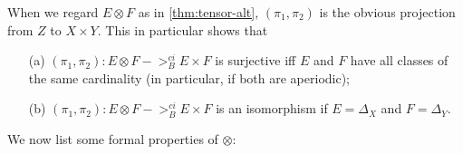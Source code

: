 \documentclass[11pt]{article}
\begin{document}
When we regard $E \otimes F$ as in \cref{thm:tensor-alt}, $(\pi_1, \pi_2)$ is the obvious projection from $Z$ to $X \times Y$.  This in particular shows that
\begin{proposition}
\label{thm:tensor-cross}
\begin{enumerate}
\item[(a)]  $(\pi_1, \pi_2) : E \otimes F ->_B^{ci} E \times F$ is surjective iff $E$ and $F$ have all classes of the same cardinality (in particular, if both are aperiodic);
\item[(b)]  $(\pi_1, \pi_2) : E \otimes F ->_B^{ci} E \times F$ is an isomorphism if $E = \Delta_X$ and $F = \Delta_Y$.
\end{enumerate}
\end{proposition}

We now list some formal properties of $\otimes$:
\end{document}
